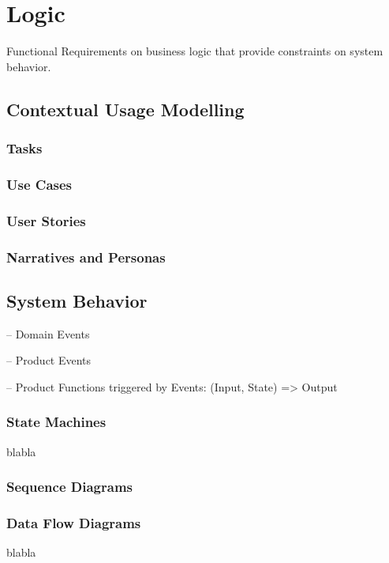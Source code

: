 
\chapter{Logic}%

Functional Requirements on business logic that provide constraints on system behavior.

\section{Contextual Usage Modelling}%

\subsection{Tasks}

\subsection{Use Cases}

\subsection{User Stories}

\subsection{Narratives and Personas}


\section{System Behavior}

-- Domain Events

-- Product Events

-- Product Functions triggered by Events: (Input, State) => Output

\subsection{State Machines}%
blabla 

\subsection{Sequence Diagrams}

\subsection{Data Flow Diagrams}%
blabla 


